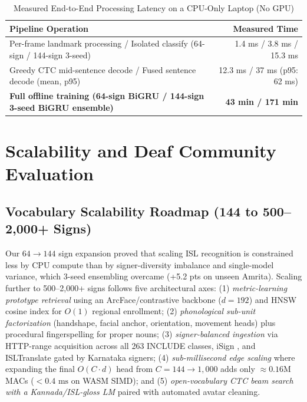 \documentclass[a4paper,12pt]{article}
\begin{document}
\begin{table}[h!]
\centering
\caption{Measured End-to-End Processing Latency on a CPU-Only Laptop (No GPU)}
\label{tab:latency}
\small
\begin{tabular}{lr}
\toprule
\textbf{Pipeline Operation} & \textbf{Measured Time} \\
\midrule
Per-frame landmark processing / Isolated classify (64-sign / 144-sign 3-seed) & 1.4 ms / 3.8 ms / 15.3 ms \\
Greedy CTC mid-sentence decode / Fused sentence decode (mean, p95) & 12.3 ms / 37 ms (p95: 62 ms) \\
\textbf{Full offline training (64-sign BiGRU / 144-sign 3-seed BiGRU ensemble)} & \textbf{43 min / 171 min} \\
\bottomrule
\end{tabular}
\end{table}

\section{Scalability and Deaf Community Evaluation}
\subsection{Vocabulary Scalability Roadmap (144 to 500--2,000+ Signs)}
Our $64 \rightarrow 144$ sign expansion proved that scaling ISL recognition is constrained less by CPU compute than by signer-diversity imbalance and single-model variance, which 3-seed ensembling overcame (+5.2 pts on unseen Amrita). Scaling further to 500--2,000+ signs follows five architectural axes: (1) \textit{metric-learning prototype retrieval} using an ArcFace/contrastive backbone ($d = 192$) and HNSW cosine index for $O(1)$ regional enrollment; (2) \textit{phonological sub-unit factorization} (handshape, facial anchor, orientation, movement heads) plus procedural fingerspelling for proper nouns; (3) \textit{signer-balanced ingestion} via HTTP-range acquisition across all 263 INCLUDE classes, iSign \cite{joshi2024isign}, and ISLTranslate \cite{joshi2023isltranslate} gated by Karnataka signers; (4) \textit{sub-millisecond edge scaling} where expanding the final $O(C\cdot d)$ head from $C = 144 \rightarrow 1{,}000$ adds only $\approx 0.16\text{M}$ MACs ($<0.4\text{ ms}$ on WASM SIMD); and (5) \textit{open-vocabulary CTC beam search with a Kannada/ISL-gloss LM} paired with automated avatar cleaning.
\end{document}
